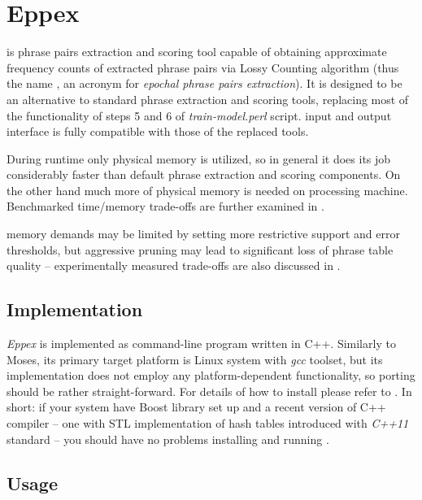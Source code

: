 \chapter{Eppex}
\label{chap:eppex}

\Eppex{} is phrase pairs extraction and scoring tool capable of obtaining
approximate frequency counts of extracted phrase pairs via Lossy Counting algorithm
(thus the name \eppex{}, an acronym for \emph{epochal phrase pairs extraction}).
It is designed to be an alternative to standard phrase extraction and scoring tools,
replacing most of the functionality of steps 5 and 6 of \emph{train-model.perl} script.
\Eppex{} input and output interface is fully compatible with those of the replaced tools.

During \eppex{} runtime only physical memory is utilized, so in general it
does its job considerably faster than default phrase extraction and scoring components.
On the other hand much more of physical memory is needed on processing machine.
Benchmarked time/memory trade-offs are further examined in .

\Eppex{} memory demands may be limited by setting more restrictive support and error thresholds,
but aggressive pruning may lead to significant loss of phrase table quality --
experimentally measured trade-offs are also discussed in .

\section{Implementation}

\emph{Eppex} is implemented as command-line program written in C++.
Similarly to Moses, its primary target platform is Linux system with \emph{gcc} toolset,
but its implementation does not employ any platform-dependent functionality,
so porting should be rather straight-forward.
For details of how to install \eppex{} please refer to .
In short: if your system have Boost library set up and a recent version of C++ compiler
-- one with STL implementation of hash tables introduced with \emph{C++11} standard --
you should have no problems installing and running \eppex{}.



\section{Usage}

